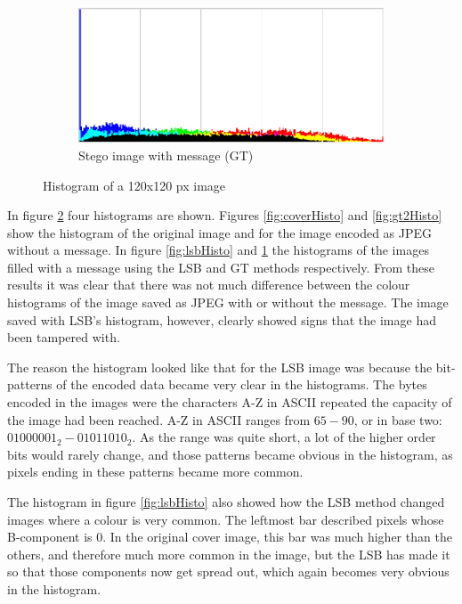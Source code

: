 \begin{figure}
\begin{subfigure}[b]{0.49\textwidth}
    \end{subfigure}
    \begin{subfigure}[b]{0.49\textwidth}
            \includegraphics[width=\textwidth]{figures/gtOutHisto.png}
            \caption{Stego image with message (GT)}
            \label{fig:gtHisto}
    \end{subfigure}
    \caption{Histogram of a 120x120 px image}
    \label{fig:histogramsComparisons}
\end{figure}

In figure \ref{fig:histogramsComparisons} four histograms are shown.
Figures \ref{fig:coverHisto} and \ref{fig:gt2Histo} show the histogram of the original image and for the image encoded as JPEG without a message.
In figure \ref{fig:lsbHisto} and \ref{fig:gtHisto} the histograms of the images filled with a message using the LSB and GT methods respectively.
From these results it was clear that there was not much difference between the colour histograms of the image saved as JPEG with or without the message.
The image saved with LSB's histogram, however, clearly showed signs that the image had been tampered with.

The reason the histogram looked like that for the LSB image was because the bit-patterns of the encoded data became very clear in the histograms.
The bytes encoded in the images were the characters A-Z in ASCII repeated the capacity of the image had been reached.
A-Z in ASCII ranges from $65-90$, or in base two: $01000001_2-01011010_2$.
As the range was quite short, a lot of the higher order bits would rarely change, and those patterns became obvious in the histogram, as pixels ending in these patterns became more common.

The histogram in figure \ref{fig:lsbHisto} also showed how the LSB method changed images where a colour is very common.
The leftmost bar described pixels whose B-component is 0.
In the original cover image, this bar was much higher than the others, and therefore much more common in the image, but the LSB has made it so that those components now get spread out, which again becomes very obvious in the histogram.

